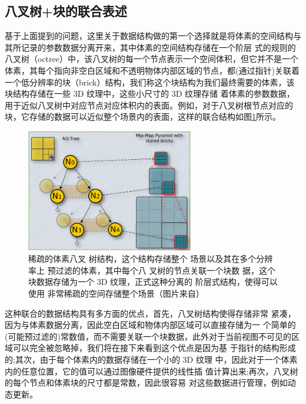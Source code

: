 \subsection{八叉树+块的联合表述}\label{sec:vct-block-plus-octree}
基于上面提到的问题，这里关于数据结构做的第一个选择就是将体素的空间结构与其所记录的参数数据分离开来，其中体素的空间结构存储在一个阶层 式的规则的八叉树（octree）中，该八叉树的每一个节点表示一个空间体积，但它并不是一个体素，其每个指向非空白区域和不透明物体内部区域的节点，都(通过指针)关联着一个低分辨率的块（brick）结构，我们称这个块结构为我们最终需要的体素，该块结构存储在一些 3D 纹理中，这些小尺寸的 3D 纹理存储 着体素的参数数据，用于近似八叉树中对应节点对应体积内的表面。例如，对于八叉树根节点对应的块，它存储的数据可以近似整个场景内的表面，这样的联合结构如图\ref{f:vct-octree}所示。

\begin{figure}
	\sidecaption
	\includegraphics[width=0.65\textwidth]{figures/vct/vct-octree}
	\caption{稀疏的体素八叉 树结构，这个结构存储整个 场景以及其在多个分辨率上 预过滤的体素，其中每个八 叉树的节点关联一个块数 据，这个块数据存储为一个 3D 纹理，正式这种分离的 阶层式结构，使得可以使用 非常稀疏的空间存储整个场景（图片来自\cite{a:Gigavoxels:Avoxelbasedrenderingpipelineforefficientexplorationoflargeanddetailedscenes}）}
	\label{f:vct-octree}
\end{figure}

这种联合的数据结构具有多方面的优点，首先，八叉树结构使得存储非常 紧凑，因为与体素数据分离，因此空白区域和物体内部区域可以直接存储为一 个简单的(可能预过滤的)常数值，而不需要关联一个块数据，此外对于当前视图不可见的区域可以完全被忽略掉，我们将在接下来看到这个优点是因为基 于指针的结构形成的;其次，由于每个体素内的数据存储在一个小的 3D 纹理 中，因此对于一个体素内的任意位置，它的值可以通过图像硬件提供的线性插 值计算出来;再次，八叉树的每个节点和体素块的尺寸都是常数，因此很容易 对这些数据进行管理，例如动态更新。



